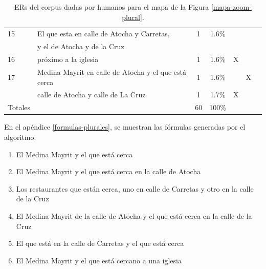\begin{table}[h]
{\begin{center}
\begin{tabular}{|l|l|c|c|c|c|c|}
15&El que esta en calle de Atocha y Carretas, 	      &	1	&	1.6\%	&&&\\
&y el de Atocha y de la Cruz	      &		&	&&&\\ \hline


16&pr\'oximo a la iglesia 	      &1		&	1.6\%	&X &&\\ \hline

17&Medina Mayrit en calle de Atocha y el que est\'a cerca  				&  1 &	1.6\%	&&X&\\ \hline
&calle de Atocha y calle de La Cruz  					&1  &	1.7\%	&X&&\\ \hline 
\hline
Totales	&&60	&	100\%	&&&\\

\hline
\end{tabular}
\caption{ERs del corpus dadas por humanos para el mapa de la Figura \ref{mapa-zoom-plural}.}\label{freq-mapa-zoom-plural}
\end{center}
}
\end{table}

En el ap\'endice \ref{formulas-plurales}, se muestran las f\'ormulas generadas por el algoritmo.


\begin{enumerate}
\item El Medina Mayrit y el que est\'a cerca
\item El Medina Mayrit y el que est\'a cerca en la calle de Atocha
\item Los restaurantes que est\'an cerca, uno en calle de Carretas y otro en la calle de la Cruz
\item El Medina Mayrit de la calle de Atocha y el que est\'a cerca en la calle de la Cruz
\item El que est\'a en la calle de Carretas y el que est\'a cerca 
\item El Medina Mayrit y el que est\'a cercano a una iglesia

\end{enumerate}    



